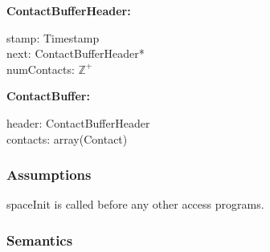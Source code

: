 \documentclass[12pt]{article}
\newcommand{\UZ}{$\mathbb{Z}^+$}
\begin{document}
	
	
	\noindent \textbf{ContactBufferHeader:}
	\begin{multicols}{3}
		\noindent stamp: Timestamp \\
		next: ContactBufferHeader* \\
		numContacts: \UZ
	\end{multicols}
	
	\noindent \textbf{ContactBuffer:}
	\begin{multicols}{2}
		\noindent header: ContactBufferHeader \\
		contacts: array(Contact) 
	\end{multicols}
	


\subsubsection{Assumptions} \label{SecASpace}
 spaceInit is called before any other access programs.

\subsubsection{Semantics}  \label{SecAPSSpace}
\end{document}
